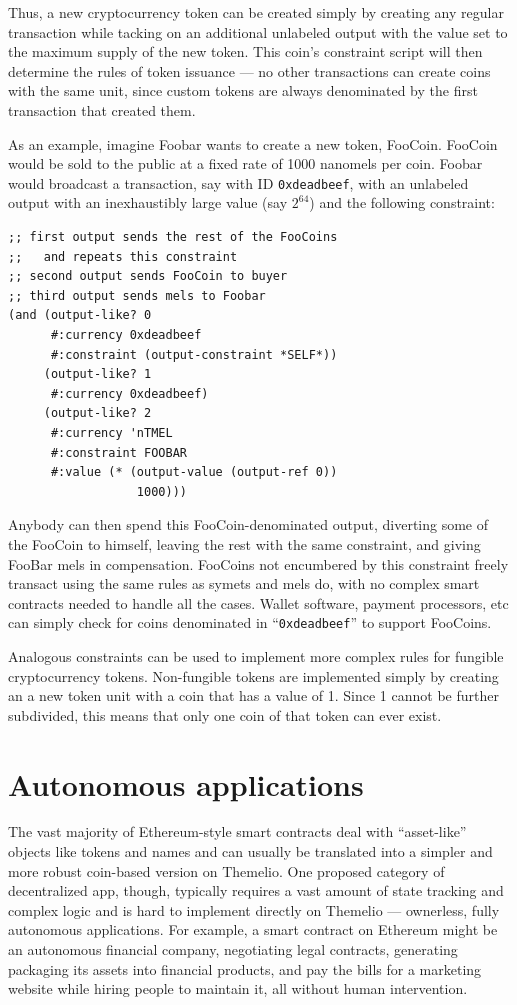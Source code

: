 \documentclass[headinclude,12pt]{scrbook}
\begin{document}
Thus, a new cryptocurrency token can be created simply by creating any regular transaction while tacking on an additional unlabeled output with the value set to the maximum supply of the new token. This coin's constraint script will then determine the rules of token issuance --- no other transactions can create coins with the same unit, since custom tokens are always denominated by the first transaction that created them.

As an example, imagine Foobar wants to create a new token, FooCoin. FooCoin would be sold to the public at a fixed rate of 1000 nanomels per coin. Foobar would broadcast a transaction, say with ID \texttt{0xdeadbeef}, with an unlabeled output with an inexhaustibly large value (say $2^{64}$) and the following constraint:

\begin{lstlisting}
;; first output sends the rest of the FooCoins
;;   and repeats this constraint
;; second output sends FooCoin to buyer
;; third output sends mels to Foobar
(and (output-like? 0
      #:currency 0xdeadbeef
      #:constraint (output-constraint *SELF*))
     (output-like? 1
      #:currency 0xdeadbeef)
     (output-like? 2
      #:currency 'nTMEL
      #:constraint FOOBAR
      #:value (* (output-value (output-ref 0))
                  1000)))
\end{lstlisting}

Anybody can then spend this FooCoin-denominated output, diverting some of the FooCoin to himself, leaving the rest with the same constraint, and giving FooBar mels in compensation. FooCoins not encumbered by this constraint freely transact using the same rules as symets and mels do, with no complex smart contracts needed to handle all the cases. Wallet software, payment processors, etc can simply check for coins denominated in ``\texttt{0xdeadbeef}'' to support FooCoins.

Analogous constraints can be used to implement more complex rules for fungible cryptocurrency tokens. Non-fungible tokens are implemented simply by creating an a new token unit with a coin that has a value of 1. Since 1 cannot be further subdivided, this means that only one coin of that token can ever exist.

\section{Autonomous applications}

The vast majority of Ethereum-style smart contracts deal with ``asset-like'' objects like tokens and names and can usually be translated into a simpler and more robust coin-based version on Themelio. One proposed category of decentralized app, though, typically requires a vast amount of state tracking and complex logic and is hard to implement directly on Themelio --- ownerless, fully autonomous applications. For example, a smart contract on Ethereum might be an autonomous financial company, negotiating legal contracts, generating packaging its assets into financial products, and pay the bills for a marketing website while hiring people to maintain it, all without human intervention.
\end{document}
